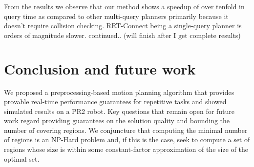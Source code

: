 \documentclass[letterpaper]{article} %
\begin{document}
From the results we observe that our method shows a speedup of over tenfold in query time as compared to other multi-query planners primarily because it doesn't require collision checking. RRT-Connect being a single-query planner is orders of magnitude slower. {\color{blue} continued.. (will finish after I get complete results)}



\section{Conclusion and future work}
We proposed a preprocessing-based motion planning algorithm that provides provable real-time performance guarantees for repetitive tasks and showed simulated results on a PR2 robot. 
Key questions that remain open for future work regard providing guarantees on the solution quality and bounding the number of covering regions.
We conjuncture that computing the minimal number of regions is an \textsf{NP-Hard} problem and, if this is the case, seek to compute a set of regions whose size is within some constant-factor approximation of  the size of the optimal set.


\end{document}
